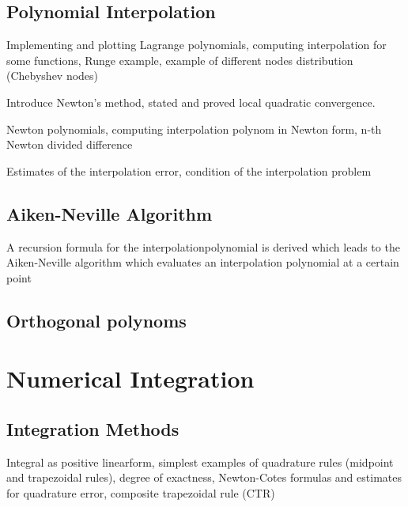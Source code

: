 \documentclass{article}
\theoremstyle{remark}
\begin{document}
\subsection{Polynomial Interpolation}%
\label{sub:polynomial_interpolation}

\begin{tcolorbox}
  Implementing and plotting Lagrange polynomials, computing interpolation for some functions, Runge example, example of different nodes distribution (Chebyshev nodes)	
\end{tcolorbox}

\begin{tcolorbox}
   Introduce Newton's method, stated and proved local quadratic convergence. 	
\end{tcolorbox}

\begin{tcolorbox}
  Newton polynomials, computing interpolation polynom in Newton form, n-th Newton divided difference	
\end{tcolorbox}

\begin{tcolorbox}
  Estimates of the interpolation error, condition of the interpolation problem	
\end{tcolorbox}

\subsection{Aiken-Neville Algorithm}%
\label{sub:aiken_neville_algorithm}


\begin{tcolorbox}
  A recursion formula for the interpolationpolynomial is derived  which leads to the Aiken-Neville algorithm which evaluates an interpolation polynomial at a certain point	
\end{tcolorbox}


\subsection{Orthogonal polynoms}%
\label{sub:orthogonal_polynoms}

\newpage
\section{Numerical Integration}%
\label{sec:numerical_integration}

\subsection{Integration Methods}%
\label{sub:trapezoid_rule}
\begin{tcolorbox}
  Integral as positive linearform, simplest examples of  quadrature rules (midpoint and trapezoidal rules), degree of exactness, Newton-Cotes formulas and estimates for quadrature error, composite trapezoidal rule (CTR)
\end{tcolorbox}
\end{document}
